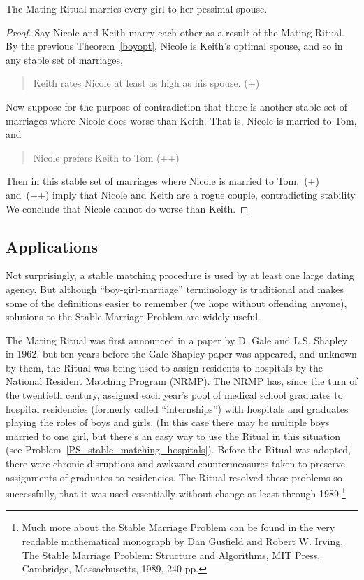 \begin{theorem}
The Mating Ritual marries every girl to her pessimal spouse.
\end{theorem}

\begin{proof}
Say Nicole and Keith marry each other as a result of the Mating Ritual.
By the previous Theorem~\ref{boyopt}, Nicole is Keith's optimal spouse,
and so in any stable set of marriages,
\begin{quote}
Keith rates Nicole at least as high as his spouse. (+)
\end{quote}

Now suppose for the purpose of contradiction that there is another stable
set of marriages where Nicole does worse than Keith.  That is, Nicole is
married to Tom, and
\begin{quote}
Nicole prefers Keith to Tom (++)
\end{quote}
Then in this stable set of marriages where Nicole is married to Tom,~(+)
and~(++) imply that Nicole and Keith are a rogue couple, contradicting
stability.  We conclude that Nicole cannot do worse than Keith.
\end{proof}

\subsection{Applications}

Not surprisingly, a stable matching procedure is used by at least one
large dating agency.  But although ``boy-girl-marriage'' terminology is
traditional and makes some of the definitions easier to remember (we hope
without offending anyone), solutions to the Stable Marriage Problem are
widely useful.

The Mating Ritual was first announced in a paper by D. Gale and
L.S. Shapley in 1962, but ten years before the Gale-Shapley paper was
appeared, and unknown by them, the Ritual was being used to assign
residents to hospitals by the National Resident Matching Program (NRMP).
The NRMP has, since the turn of the twentieth century, assigned each
year's pool of medical school graduates to hospital residencies (formerly
called ``internships'') with hospitals and graduates playing the roles of
boys and girls.  (In this case there may be multiple boys married to one
girl, but there's an easy way to use the Ritual in this situation (see
Problem~\ref{PS_stable_matching_hospitals}).  Before the Ritual was
adopted, there were chronic disruptions and awkward countermeasures taken
to preserve assignments of graduates to residencies.  The Ritual resolved
these problems so successfully, that it was used essentially without
change at least through 1989.\footnote{Much more about the Stable Marriage
  Problem can be found in the very readable mathematical monograph by Dan
  Gusfield and Robert W. Irving,
  \href{http://mitpress.mit.edu/catalog/item/default.asp?ttype=2&tid=7676}{The
    Stable Marriage Problem: Structure and Algorithms}, MIT Press,
  Cambridge, Massachusetts, 1989, 240 pp.}

